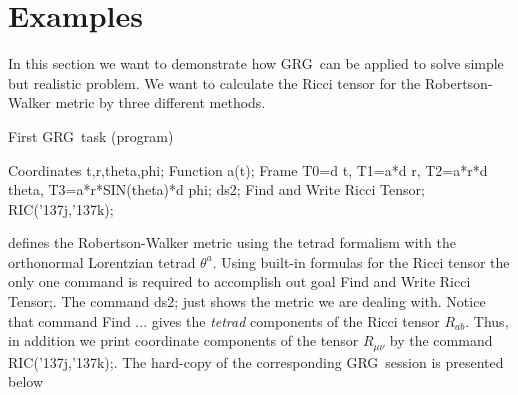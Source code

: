 \documentclass[twoside,openright]{report}
\newcommand{\grgtt}{\ttfamily}
\renewcommand{\tt}{\grgtt}
\def\_{{\tt \char'137}}                     %
\newcommand{\grg}{{\sc GRG}}
\begin{document}
\section{Examples}

In this section we want to demonstrate how \grg\ can be applied
to solve simple but realistic problem.
We want to calculate the  Ricci tensor for the Robertson-Walker
metric by three different methods.

First \grg\ task (program)
\begin{listing}
   Coordinates t,r,theta,phi;
   Function a(t);
   Frame T0=d t, T1=a*d r, T2=a*r*d theta, T3=a*r*SIN(theta)*d phi;
   ds2;
   Find and Write Ricci Tensor;
   RIC(\_j,\_k);
\end{listing}
defines the Robertson-Walker metric using the tetrad
formalism with the orthonormal Lorentzian tetrad $\theta^a$.
Using built-in formulas for the Ricci tensor the only one command
is required to accomplish out goal
{\tt Find and Write Ricci Tensor;}. The command {\tt ds2;}
just shows the metric we are dealing with. Notice that
command {\tt Find ...} gives the \emph{tetrad} components of the Ricci
tensor $R_{ab}$. Thus, in addition we print coordinate
components of the tensor $R_{\mu\nu}$ by the command
{\tt RIC(\_j,\_k);}. The hard-copy of the corresponding
\grg\ session is presented below \enlargethispage{4mm}
\end{document}
